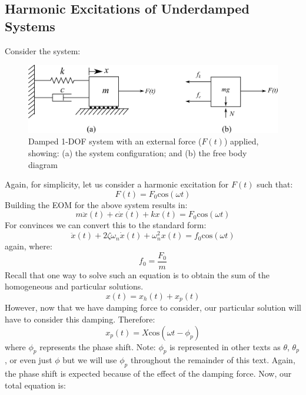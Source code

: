 \documentclass[12pt,letter]{article}
\begin{document}
\subsection{Harmonic Excitations of Underdamped Systems}

	Consider the system:
	\begin{figure}[H]
		\centering
		\includegraphics[]{../figures/1-DOF-spring_dashpot_mass_horizontal_forced_FBD.png}
		\caption{Damped 1-DOF system with an external force ($F(t)$) applied, showing: (a) the system configuration; and (b) the free body diagram}
	\end{figure}	
	\noindent Again, for simplicity, let us consider a harmonic excitation for $F(t)$ such that:
	\begin{equation}
		F(t) = F_0\text{cos}(\omega t)
	\end{equation}							
	Building the EOM for the above system results in:
	\begin{equation}
		m \ddot{x}(t)+c\dot{x}(t)+kx(t) = F_0\text{cos}(\omega t)
	\end{equation}			
	For convinces we can convert this to the standard form:					
	\begin{equation}
		\ddot{x}(t)+2 \zeta \omega_n \dot{x}(t) +\omega_n^2x(t) = f_0\text{cos}(\omega t)
	\end{equation}					
	again, where:
	\begin{equation}
		f_0 = \frac{F_0}{m}
	\end{equation}	
	Recall that one way to solve such an equation is to obtain the sum of the homogeneous and particular solutions. 
	\begin{equation}
		x(t) = x_h(t) + x_p(t)
	\end{equation}	
	However, now that we have damping force to consider, our particular solution will have to consider this damping. Therefore:
	\begin{equation}
		\label{eq:x_p(t)}
		x_p(t) = X \text{cos}(\omega t - \phi_p)
	\end{equation}
	where $\phi_p$ represents the phase shift. Note: $\phi_p$ is represented in other texts as $\theta$, $\theta_p$, or even just $\phi$ but we will use $\phi_p$ throughout the remainder of this text. Again, the phase shift is expected because of the effect of the damping force. Now, our total equation is:
\end{document}

